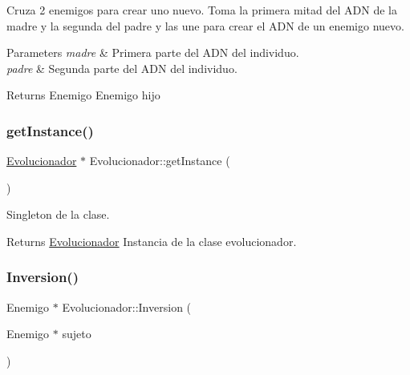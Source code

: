 Cruza 2 enemigos para crear uno nuevo. Toma la primera mitad del A\+DN de la madre y la segunda del padre y las une para crear el A\+DN de un enemigo nuevo. 


\begin{DoxyParams}{Parameters}
{\em madre} & Primera parte del A\+DN del individuo. \\
\hline
{\em padre} & Segunda parte del A\+DN del individuo. \\
\hline
\end{DoxyParams}
\begin{DoxyReturn}{Returns}
Enemigo Enemigo hijo 
\end{DoxyReturn}
\mbox{\label{classEvolucionador_abd8e31b02a6d1dd2a6e21271b8e3554b}} 
\subsubsection{\texorpdfstring{get\+Instance()}{getInstance()}}
{\footnotesize\ttfamily \hyperlink{classEvolucionador}{Evolucionador} $\ast$ Evolucionador\+::get\+Instance (\begin{DoxyParamCaption}{ }\end{DoxyParamCaption})\hspace{0.3cm}{\ttfamily [static]}}



Singleton de la clase. 

\begin{DoxyReturn}{Returns}
\hyperlink{classEvolucionador}{Evolucionador} Instancia de la clase evolucionador. 
\end{DoxyReturn}
\mbox{\label{classEvolucionador_a8607ddfc5393279f196e3558f108a622}} 
\subsubsection{\texorpdfstring{Inversion()}{Inversion()}}
{\footnotesize\ttfamily Enemigo $\ast$ Evolucionador\+::\+Inversion (\begin{DoxyParamCaption}\item[{Enemigo $\ast$}]{sujeto }\end{DoxyParamCaption})}



